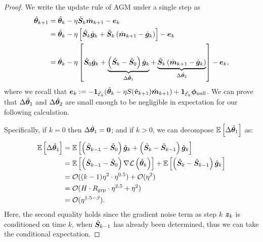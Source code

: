 \begin{proof}
We write the update rule of AGM under a single step as
\begin{align*}
    \hat{\vtheta}_{k+1} &= \hat{\vtheta}_{k} - \eta \hat{\mS}_k \hat{\vm}_{k+1} - \ve_k \\
    &= \hat{\vtheta}_{k} - \eta \left[ \hat{\mS}_k \hat{\vg}_k + \hat{\mS}_k \left(\hat{\vm}_{k+1} - \hat{\vg}_k\right) \right] - \ve_k \\
    &= \hat{\vtheta}_{k} - \eta \left[ \hat{\mS}_0 \hat{\vg}_k + \underbrace{\left( \hat{\mS}_k - \hat{\mS}_0\right) \hat{\vg}_k}_{\Delta \hat{\vtheta}_1} +  \underbrace{\hat{\mS}_k \left(\hat{\vm}_{k+1} - \hat{\vg}_k\right)}_{\Delta \hat{\vtheta}_2} \right] - \ve_k,
\end{align*}
where we recall that $\ve_{k} :=- \1_{\bar{\cE}_k}(\hat{\vtheta}_{k} - \eta S(\hat{\vv}_{k+1}) \hat{\vm}_{k+1} ) + \1_{\bar{\cE}_k}\vphi_{\mathrm{null}}$.
We can prove that $\Delta \hat{{\bm{\theta}}}_1$ and $\Delta \hat{{\bm{\theta}}}_2$ are small enough to be negligible in expectation for our following calculation.

Specifically, if $k = 0$ then $\Delta \hat{{\bm{\theta}}}_1 = \boldsymbol{0}$; and if $k > 0$, we can decompose $\mathbb{E}\left[\Delta \hat{{\bm{\theta}}}_1 \right]$ as: \begin{align*}
    \mathbb{E}\left[\Delta \hat{{\bm{\theta}}}_1 \right] &= \mathbb{E}\left[\left(\hat{{\bm{S}}}_{k-1} - \hat{{\bm{S}}}_0\right) \hat{{\bm{g}}}_k + \left(\hat{{\bm{S}}}_k - \hat{{\bm{S}}}_{k-1}\right) \hat{{\bm{g}}}_k\right] \\
    &= \mathbb{E}\left[\left(\hat{{\bm{S}}}_{k-1} - \hat{{\bm{S}}}_0\right) \nabla \mathcal{L}\left(\hat{{\bm{\theta}}}_k\right) \right] + \mathbb{E}\left[\left(\hat{{\bm{S}}}_{k} - \hat{{\bm{S}}}_{k-1}\right) \hat{{\bm{g}}}_k \right] \\
    &= \mathcal{O}((k-1)\eta^2 \cdot \eta^{0.5}) + \mathcal{O}(\eta^2) \\
    &= \mathcal{O}(H \cdot R_{\mathrm{grp}} \cdot \eta^{2.5} + \eta^2) \\
    &= \mathcal{O}(\eta^{1.5 - \beta}).
\end{align*}
Here, the second equality holds since the gradient noise term as step $k$ ${\bm{z}}_k$ is conditioned on time $k$, when $\hat{{\bm{S}}}_{k-1}$ has already been determined, thus we can take the conditional expectation. 


\end{proof}
